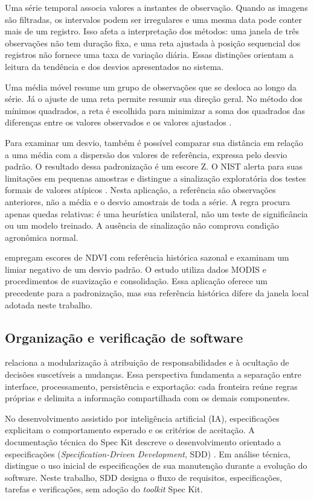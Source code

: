 Uma série temporal associa valores a instantes de observação. Quando as imagens são filtradas, os intervalos podem ser irregulares e uma mesma data pode conter mais de um registro. Isso afeta a interpretação dos métodos: uma janela de três observações não tem duração fixa, e uma reta ajustada à posição sequencial dos registros não fornece uma taxa de variação diária. Essas distinções orientam a leitura da tendência e dos desvios apresentados no sistema.

Uma média móvel resume um grupo de observações que se desloca ao longo da série. Já o ajuste de uma reta permite resumir sua direção geral. No método dos mínimos quadrados, a reta é escolhida para minimizar a soma dos quadrados das diferenças entre os valores observados e os valores ajustados \citep{HYNDMAN2021}.

Para examinar um desvio, também é possível comparar sua distância em relação a uma média com a dispersão dos valores de referência, expressa pelo desvio padrão. O resultado dessa padronização é um escore Z. O NIST alerta para suas limitações em pequenas amostras e distingue a sinalização exploratória dos testes formais de valores atípicos \citep{NIST_OUTLIERS}. Nesta aplicação, a referência são observações anteriores, não a média e o desvio amostrais de toda a série. A regra procura apenas quedas relativas: é uma heurística unilateral, não um teste de significância ou um modelo treinado. A ausência de sinalização não comprova condição agronômica normal.

\citet{MERONI2019} empregam escores de NDVI com referência histórica sazonal e examinam um limiar negativo de um desvio padrão. O estudo utiliza dados MODIS e procedimentos de suavização e consolidação. Essa aplicação oferece um precedente para a padronização, mas sua referência histórica difere da janela local adotada neste trabalho.

\subsection{Organização e verificação de software}

\citet{PARNAS1972} relaciona a modularização à atribuição de responsabilidades e à ocultação de decisões suscetíveis a mudanças. Essa perspectiva fundamenta a separação entre interface, processamento, persistência e exportação: cada fronteira reúne regras próprias e delimita a informação compartilhada com os demais componentes.

No desenvolvimento assistido por inteligência artificial (IA), especificações explicitam o comportamento esperado e os critérios de aceitação. A documentação técnica do Spec Kit descreve o desenvolvimento orientado a especificações (\textit{Specification-Driven Development}, SDD) \citep{GITHUB_SDD}. Em análise técnica, \citet{BOECKELER2025} distingue o uso inicial de especificações de sua manutenção durante a evolução do software. Neste trabalho, SDD designa o fluxo de requisitos, especificações, tarefas e verificações, sem adoção do \textit{toolkit} Spec Kit.


